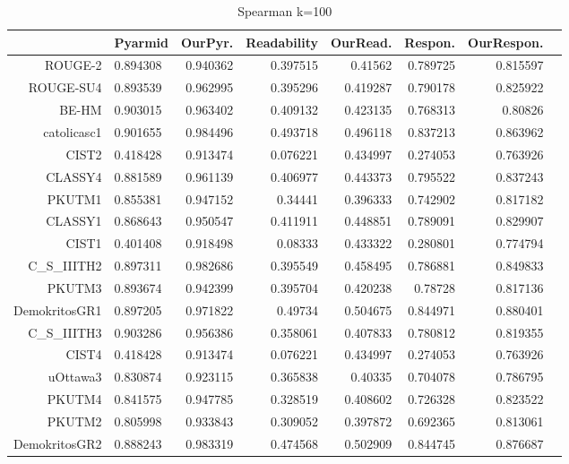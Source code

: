 \begin{table}[htbp]
\tiny
  \centering
  \caption{Spearman k=100}
    \begin{tabular}{rlrrrrrr}
    \hline
          & \multicolumn{1}{l}{Pyarmid} & \multicolumn{1}{l}{OurPyr.} & \multicolumn{1}{l}{Readability} & \multicolumn{1}{l}{OurRead.} & \multicolumn{1}{l}{Respon.} & \multicolumn{1}{l}{OurRespon.} \\
    \hline
    ROUGE-2        & 0.894308 & 0.940362 & 0.397515 & 0.41562 & 0.789725 & 0.815597 \\
    ROUGE-SU4       & 0.893539 & 0.962995 & 0.395296 & 0.419287 & 0.790178 & 0.825922 \\
    BE-HM           & 0.903015 & 0.963402 & 0.409132 & 0.423135 & 0.768313 & 0.80826 \\
    catolicasc1     & 0.901655 & 0.984496 & 0.493718 & 0.496118 & 0.837213 & 0.863962 \\
    CIST2          & 0.418428 & 0.913474 & 0.076221 & 0.434997 & 0.274053 & 0.763926 \\
    CLASSY4         & 0.881589 & 0.961139 & 0.406977 & 0.443373 & 0.795522 & 0.837243 \\
    PKUTM1 & 0.855381 & 0.947152 & 0.34441 & 0.396333 & 0.742902 & 0.817182 \\
    CLASSY1 & 0.868643 & 0.950547 & 0.411911 & 0.448851 & 0.789091 & 0.829907 \\
    CIST1 & 0.401408 & 0.918498 & 0.08333 & 0.433322 & 0.280801 & 0.774794 \\
    C\_S\_IIITH2 & 0.897311 & 0.982686 & 0.395549 & 0.458495 & 0.786881 & 0.849833 \\
    PKUTM3 & 0.893674 & 0.942399 & 0.395704 & 0.420238 & 0.78728 & 0.817136 \\
    DemokritosGR1 & 0.897205 & 0.971822 & 0.49734 & 0.504675 & 0.844971 & 0.880401 \\
    C\_S\_IIITH3 & 0.903286 & 0.956386 & 0.358061 & 0.407833 & 0.780812 & 0.819355 \\
    CIST4 & 0.418428 & 0.913474 & 0.076221 & 0.434997 & 0.274053 & 0.763926 \\
    uOttawa3 & 0.830874 & 0.923115 & 0.365838 & 0.40335 & 0.704078 & 0.786795 \\
    PKUTM4 & 0.841575 & 0.947785 & 0.328519 & 0.408602 & 0.726328 & 0.823522 \\
    PKUTM2 & 0.805998 & 0.933843 & 0.309052 & 0.397872 & 0.692365 & 0.813061 \\
    DemokritosGR2 & 0.888243 & 0.983319 & 0.474568 & 0.502909 & 0.844745 & 0.876687 \\

\end{tabular}
\end{table}
